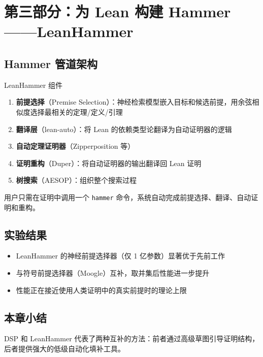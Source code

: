 \section{第三部分：为 Lean 构建 Hammer——LeanHammer}

\subsection{Hammer 管道架构}

\begin{importantbox}{LeanHammer 组件}
\begin{enumerate}
    \item \textbf{前提选择}（Premise Selection）：神经检索模型嵌入目标和候选前提，用余弦相似度选择最相关的定理/定义/引理
    \item \textbf{翻译层}（lean-auto）：将 Lean 的依赖类型论翻译为自动证明器的逻辑
    \item \textbf{自动定理证明器}（Zipperposition 等）
    \item \textbf{证明重构}（Duper）：将自动证明器的输出翻译回 Lean 证明
    \item \textbf{树搜索}（AESOP）：组织整个搜索过程
\end{enumerate}
\end{importantbox}

用户只需在证明中调用一个 \texttt{hammer} 命令，系统自动完成前提选择、翻译、自动证明和重构。

\subsection{实验结果}

\begin{itemize}
    \item LeanHammer 的神经前提选择器（仅 1 亿参数）显著优于先前工作
    \item 与符号前提选择器（Moogle）互补，取并集后性能进一步提升
    \item 性能正在接近使用人类证明中的真实前提时的理论上限
\end{itemize}

\subsection{本章小结}

DSP 和 LeanHammer 代表了两种互补的方法：前者通过高级草图引导证明结构，后者提供强大的低级自动化填补工具。

